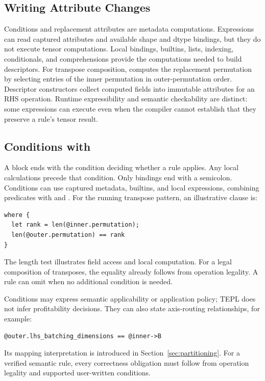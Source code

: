 \FloatBarrier
\subsection{Writing Attribute Changes}
Conditions and replacement attributes are metadata computations. Expressions
can read captured attributes and available shape and dtype bindings, but they
do not execute tensor computations. Local bindings, builtins, lists, indexing,
conditionals, and comprehensions provide the computations needed to build
descriptors. For transpose composition,
 computes the replacement
permutation by selecting entries of the inner permutation in outer-permutation
order. Descriptor constructors collect computed fields into immutable
attributes for an RHS operation. Runtime expressibility and semantic
checkability are distinct: some expressions can execute even when the
compiler cannot establish that they preserve a rule's tensor result.

\FloatBarrier
\subsection{Conditions with \texorpdfstring{}{where}}
\label{sec:where}
A  block ends with the condition deciding whether a rule applies.
Any local calculations precede that condition. Only  bindings end
with a semicolon. Conditions can use captured metadata, builtins, and local
expressions, combining predicates with \code{&&} and \code{||}. For the running
transpose pattern, an illustrative clause is:
\begin{codeblock}[H]
\begin{lstlisting}[language=TEPL]
where {
  let rank = len(@inner.permutation);
  len(@outer.permutation) == rank
}
\end{lstlisting}
\end{codeblock}
The length test illustrates field access and local computation. For a legal
composition of transposes, the equality already follows from operation
legality. A rule can omit  when no additional condition is needed.

Conditions may express semantic applicability or application policy; TEPL does
not infer profitability decisions. They can also state axis-routing
relationships, for example:
\begin{codeblock}[H]
\begin{lstlisting}[language=TEPL]
@outer.lhs_batching_dimensions == @inner->B
\end{lstlisting}
\end{codeblock}
Its mapping interpretation is introduced in Section~\ref{sec:partitioning}. For a verified semantic rule,
every correctness obligation must follow from operation legality and supported
user-written conditions.

